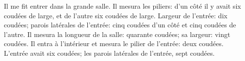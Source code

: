 Il me fit entrer dans la grande salle.
Il mesura les piliers:
	d’un côté il y avait six coudées de large, et de l’autre six coudées de large.
Largeur de l’entrée: dix coudées;
	parois latérales de l’entrée: cinq coudées d’un côté et cinq coudées de l’autre.
Il mesura la longueur de la salle: quarante coudées;
	sa largeur: vingt coudées.
Il entra à l’intérieur et mesura le pilier de l’entrée: deux coudées.
	L’entrée avait six coudées; les parois latérales de l’entrée, sept coudées.
